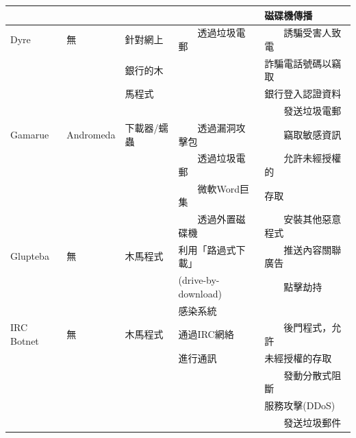 \documentclass[14pt]{extarticle}
\newcommand{\tabitem}{~~\llap{\textbullet}~~}
\begin{document}
\begin{table}[!htbp]
\begin{tabular}{lllll}
 & & & & 磁碟機傳播 \\\hline
Dyre & 無 & 針對網上 & \tabitem 透過垃圾電郵 & \tabitem 誘騙受害人致電 \\
 & & 銀行的木 & & 詐騙電話號碼以竊取 \\
 & & 馬程式 & & 銀行登入認證資料 \\
 & & & & \tabitem 發送垃圾電郵 \\\hline
Gamarue & Andromeda & 下載器/蠕蟲 & \tabitem 透過漏洞攻擊包 & \tabitem 竊取敏感資訊 \\
 & & & \tabitem 透過垃圾電郵 & \tabitem 允許未經授權的 \\
 & & & \tabitem 微軟Word巨集 &  存取 \\
 & & & \tabitem 透過外置磁碟機 & \tabitem 安裝其他惡意程式 \\\hline
Glupteba & 無 & 木馬程式 & 利用「路過式下載」 & \tabitem 推送內容關聯廣告 \\
 & & & (drive-by-download) & \tabitem 	點擊劫持 \\ 
 & & & 感染系統 \\\hline
IRC Botnet & 無 & 木馬程式 &  通過IRC網絡 & \tabitem	後門程式，允許 \\
 &&& 進行通訊 & 未經授權的存取 \\
 &&&& \tabitem 發動分散式阻斷 \\
 &&&& 服務攻擊(DDoS) \\
 &&&& \tabitem 發送垃圾郵件 \\\hline
\end{tabular}
\end{table}
\end{document}
